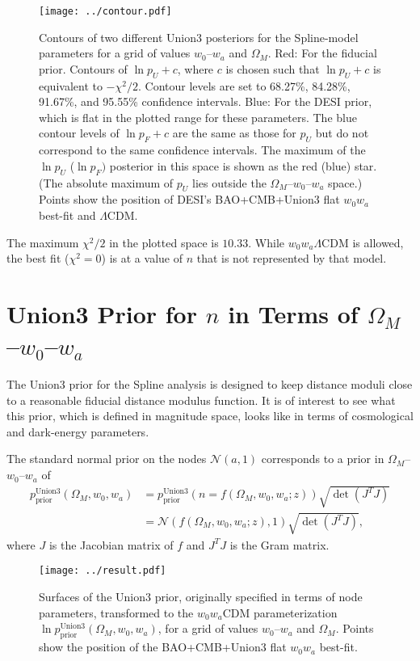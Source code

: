 \documentclass[11pt,a4paper]{article}
\begin{document}
\begin{figure}[htbp] %
   \centering
   \texttt{[image: ../contour.pdf]} 
   \caption{Contours of two different Union3 posteriors for the Spline-model parameters for a grid of values
 $w_0$--$w_a$ and $\Omega_M$.   
  Red: For the fiducial prior.  Contours of  $\ln{p_U}+c$, where $c$ is chosen such that $\ln{p_U}+c$  is equivalent to  $-\chi^2/2$. Contour levels are set to 68.27\%, 84.28\%, 91.67\%, and 95.55\% confidence intervals.
   Blue: For the DESI prior, which is flat in the plotted range for these parameters. 
   The blue contour levels of $\ln{p_F}+c$ are the same as those for $p_U$ but do not correspond to the same confidence intervals.
   The maximum of the $\ln{p}_U$  ($\ln{p}_F)$ posterior in this space is shown as the red (blue) star.  (The absolute maximum
   of $p_U$
   lies outside the $\Omega_M$--$w_0$--$w_a$ space.)
   Points show the position of DESI's  BAO+CMB+Union3 flat $w_0w_a$ best-fit 
    and  $\Lambda$CDM.}
   \label{fig:posterior}
\end{figure}

The maximum $\chi^2/2$ in the plotted space is $10.33$.  While $w_0w_a\Lambda$CDM is allowed, the best fit ($\chi^2=0$)
is at a value of $n$ that is not represented by that model. 

\section{Union3 Prior for $n$ in Terms of $\Omega_M$--$w_0$--$w_a$}
\label{sec:prior}
The Union3 prior for the Spline analysis is designed to keep distance moduli close to a reasonable
fiducial distance modulus function.  It is of interest to see what this prior, which is defined in magnitude
space, looks like in terms of cosmological and dark-energy parameters.

The standard normal prior on the nodes $\mathcal{N}(a,1)$ corresponds to a prior in  $\Omega_M$--$w_0$--$w_a$ of
\begin{align}
p^\text{Union3}_\text{prior}(\Omega_M, w_0,w_a)  & =p^\text{Union3}_\text{prior}(n=f(\Omega_M, w_0, w_a; z))  \sqrt{\det{\left(J^T J\right)}} \\
& = \mathcal{N}(f(\Omega_M, w_0, w_a; z),1)  \sqrt{\det{\left(J^T J\right)}}, \label{eq:Union3prior}
\end{align}
where $J$ is the Jacobian matrix of $f$ and $J^TJ$ is the Gram matrix.

\begin{figure}[htbp] %
   \centering
   \texttt{[image: ../result.pdf]} 
   \caption{Surfaces of the Union3 prior, originally specified in terms of node parameters, transformed to the $w_0w_a$CDM parameterization
   $\ln{p^\text{Union3}_\text{prior}}(\Omega_M, w_0,w_a)$,  for a grid of values
 $w_0$--$w_a$ and $\Omega_M$.   
   Points show the position of the BAO+CMB+Union3 flat $w_0w_a$ best-fit.}
   \label{fig:priors}
\end{figure}
\end{document}
